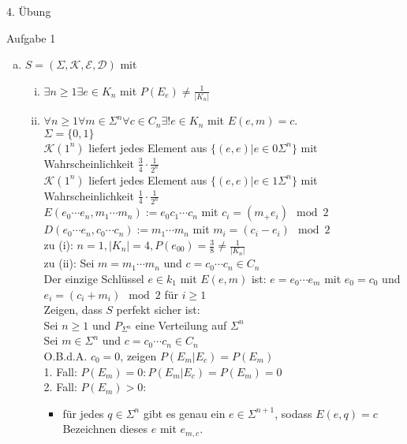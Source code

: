 \begin{section}{4. Übung}
 \begin{subsection}{Aufgabe 1}
  \begin{enumerate}[a)]
   \item  $S=(\Sigma, \mathcal{K}, \mathcal{E}, \mathcal{D})$ mit
   \begin{enumerate}[(i)]
    \item $\exists n \geq 1 \exists e \in K_n$ mit $P(E_e) \neq \frac{1}{|K_n|}$
    \item $\forall n \geq 1 \forall m \in \Sigma^n \forall c \in C_n \exists! e\in K_n$ mit $E(e,m)=c$.\\
    $\Sigma = \{0,1\}$\\
    $\mathcal{K}(1^n)$ liefert jedes Element aus $\{(e,e)| e \in 0\Sigma^n\}$ mit Wahrscheinlichkeit $\frac{3}{4} \cdot \frac{1}{2^n}$\\
    $\mathcal{K}(1^n)$ liefert jedes Element aus $\{(e,e)| e \in 1\Sigma^n\}$ mit Wahrscheinlichkeit $\frac{1}{4} \cdot \frac{1}{2^n}$\\
    $E(e_0 \cdots e_n, m_1 \cdots m_n) := e_0c_1 \cdots c_n$ mit $c_i = (m_ + e_i) \mod 2$ \\
    $D(e_0 \cdots e_n, c_0 \cdots c_n) := m_1 \cdots m_n$ mit $m_i = (c_i - e_i) \mod 2$\\
    zu (i): $n = 1, |K_n| = 4, P(e_{00}) = \frac{3}{8} \neq \frac{1}{|K_n|}$\\
    zu (ii): Sei $m=m_1 \cdots m_n$ und $c = c_0 \cdots c_n \in C_n$\\
    Der einzige Schlüssel $e \in k_1$ mit $E(e,m)$ ist: $e=e_0\cdots e_m$ mit $e_0 = c_0$ und $e_i = (c_i + m_i) \mod 2$ für $i \geq 1$\\
    Zeigen, dass $S$ perfekt sicher ist:\\
    Sei $n \geq 1$ und $P_{\Sigma^n}$ eine Verteilung auf $\Sigma^n$\\
    Sei $m \in \Sigma^n$ und $c = c_0 \cdots c_n \in C_n$\\
    O.B.d.A. $c_0 = 0$, zeigen $P(E_m|E_c) = P(E_m)$\\
    1. Fall: $P(E_m) = 0: P(E_m|E_c) = P(E_m) = 0$\\
    2. Fall: $P(E_m) > 0$:\\
    \begin{itemize}
     \item für jedes  $q \in \Sigma^n$ gibt es genau ein $e \in \Sigma^{n+1}$, sodass $E(e,q) = c$ \\
     Bezeichnen dieses $e$ mit $e_{m,c}$. \\

\end{itemize}
\end{enumerate}
\end{enumerate}
\end{subsection}
\end{section}
